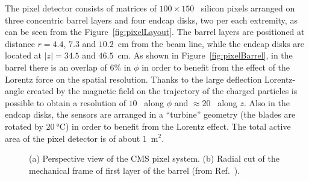 The pixel detector consists of matrices of $100\times150$~\si{\mum} silicon pixels
arranged on three concentric barrel layers and four endcap disks, two per
each extremity, as can be seen from the Figure~\ref{fig:pixelLayout}. 
The barrel layers are positioned at distance $r=4.4$, $7.3$ and $10.2$~\si{cm} 
from the beam line, while the endcap disks are located at $|z|=34.5$ and $46.5$~\si{cm}.
As shown in Figure~\ref{fig:pixelBarrel}, in the barrel there is an overlap of 6\%
in $\phi$ in order to benefit from the effect of the Lorentz force on the spatial resolution.
Thanks to the large deflection Lorentz-angle created by the magnetic field
on the trajectory of the charged particles is possible to obtain a resolution of $10$~\si{\mum} 
along $\phi$ and $\approx 20$~\si{\mum} along $z$. Also in the endcap disks, the sensors 
are arranged in a ``turbine'' geometry (the blades are rotated by $20~\si{\degreeCelsius}$) 
in order to benefit from the Lorentz effect. The total active area of the pixel detector is of about 1~\si{m}$^2$.

\begin{figure}[h!]
  \begin{center}
    \caption{(a) Perspective view of the CMS pixel system. (b) Radial cut of the mechanical 
	    frame of first layer of the barrel (from Ref.~\cite{Karimaki:368412}).} 
    \label{fig:pixels}
  \end{center}
\end{figure}

